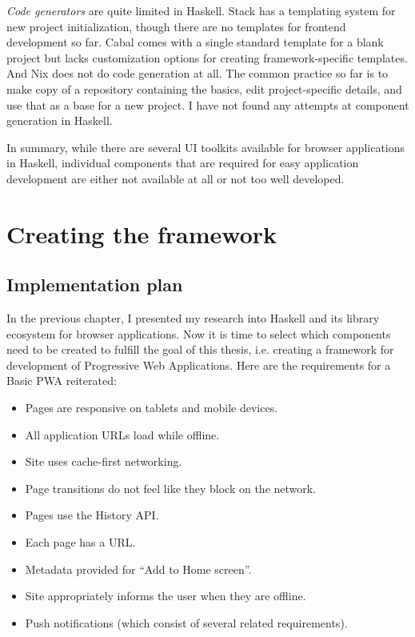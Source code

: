 \documentclass[english,odsaz]{fitthesis}
\begin{document}
\emph{Code generators} are quite limited in Haskell. Stack has a templating system for
new project initialization, though there are no templates for frontend
development so far. Cabal comes with a single standard template for a blank
project but lacks customization options for creating framework-specific
templates. And Nix does not do code generation at all. The common practice so
far is to make copy of a repository containing the basics, edit project-specific
details, and use that as a base for a new project. I have not found any attempts
at component generation in Haskell.

In summary, while there are several UI toolkits available for browser
applications in Haskell, individual components that are required for easy
application development are either not available at all or not too well
developed.

\chapter{Creating the framework}
\label{sec:orga788627}
\section{Implementation plan}
\label{sec:org82f9b3c}
In the previous chapter, I presented my research into Haskell and its library
ecosystem for browser applications. Now it is time to select which components
need to be created to fulfill the goal of this thesis, i.e. creating a framework
for development of Progressive Web Applications. Here are the requirements for a
Basic PWA reiterated:

\begin{itemize}
\item Pages are responsive on tablets and mobile devices.
\item All application URLs load while offline.
\item Site uses cache-first networking.
\item Page transitions do not feel like they block on the network.
\item Pages use the History API.
\item Each page has a URL.
\item Metadata provided for ``Add to Home screen''.
\item Site appropriately informs the user when they are offline.
\item Push notifications (which consist of several related requirements).
\end{itemize}
\end{document}
